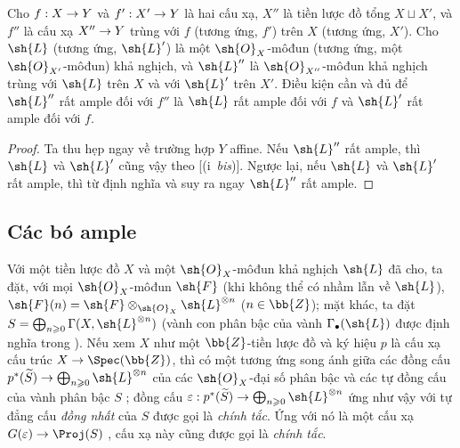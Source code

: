 \documentclass[oneside,10pt]{amsart}
\makeatletter
\renewcommand{\geq}{\geqslant}
\newcommand{\ega@arrow}[2]{\mathchoice{#1}{#2}{#2}{#2}}
\renewcommand{\to}{\ega@arrow{\longrightarrow}{\rightarrow}}
\let\EGAOriginalLabel\label
\renewcommand{\label}[1]{\phantomsection\EGAOriginalLabel{#1}}
\makeatother
\begin{document}
\begin{proposition}[4.4.11]
\label{II.4.4.11}
Cho $f:X\to Y$ và $f':X'\to Y$ là hai cấu xạ, $X''$ là tiền lược đồ tổng $X\sqcup X'$, và $f''$ là cấu xạ $X''\to Y$ trùng với $f$ (tương ứng, $f'$) trên $X$ (tương ứng, $X'$).
Cho $\sh{L}$ (tương ứng, $\sh{L}'$) là một $\sh{O}_X$-môđun (tương ứng, một $\sh{O}_{X'}$-môđun) khả nghịch, và $\sh{L}''$ là $\sh{O}_{X''}$-môđun khả nghịch trùng với $\sh{L}$ trên $X$ và với $\sh{L}'$ trên $X'$.
Điều kiện cần và đủ để $\sh{L}''$ rất ample đối với $f''$ là $\sh{L}$ rất ample đối với $f$ và $\sh{L}'$ rất ample đối với $f$.
\end{proposition}

\begin{proof}
Ta thu hẹp ngay về trường hợp $Y$ affine.
Nếu $\sh{L}''$ rất ample, thì $\sh{L}$ và $\sh{L}'$ cũng vậy theo [(i~\emph{bis})].
Ngược lại, nếu $\sh{L}$ và $\sh{L}'$ rất ample, thì từ định nghĩa  và  suy ra ngay $\sh{L}''$ rất ample.
\end{proof}

\subsection{Các bó ample}
\label{subsection:II.4.5}

\begin{env}[4.5.1]
\label{II.4.5.1}
Với một tiền lược đồ $X$ và một $\sh{O}_X$-môđun khả nghịch $\sh{L}$ đã cho, ta đặt, với mọi $\sh{O}_X$-môđun $\sh{F}$ (khi không thể có nhầm lẫn về $\sh{L}$), $\sh{F}(n)=\sh{F}\otimes_{\sh{O}_X}\sh{L}^{\otimes n}$ ($n\in\bb{Z}$);
mặt khác, ta đặt $S=\bigoplus_{n\geq0}\Gamma(X,\sh{L}^{\otimes n})$ (vành con phân bậc của vành $\Gamma_\bullet(\sh{L})$ được định nghĩa trong ).
Nếu xem $X$ như một $\bb{Z}$-tiền lược đồ và ký hiệu $p$ là cấu xạ cấu trúc $X\to\Spec(\bb{Z})$, thì có một tương ứng song ánh giữa các đồng cấu $p^*(\widetilde{S})\to\bigoplus_{n\geq0}\sh{L}^{\otimes n}$ của các $\sh{O}_X$-đại số phân bậc và các tự đồng cấu của vành phân bậc $S$ ;
đồng cấu $\varepsilon:p^*(\widetilde{S})\to\bigoplus_{n\geq0}\sh{L}^{\otimes n}$ ứng như vậy với tự đẳng cấu \emph{đồng nhất} của $S$ được gọi là \emph{chính tắc}.
Ứng với nó là một cấu xạ $G(\varepsilon)\to\Proj(S)$ , cấu xạ này cũng được gọi là \emph{chính tắc}.
\end{env}
\end{document}

